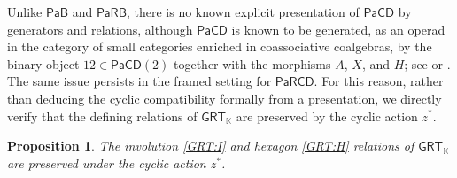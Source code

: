 \documentclass{amsart}
\newcommand{\kk}{\mathbb{K}}    %
\newcommand{\PaRB}{\mathsf{PaRB}}
\newcommand{\PaRCD}{\mathsf{PaRCD}}
\newcommand{\PaCD}{\mathsf{PaCD}}
\newcommand{\hPaRCD}{{\PaRCD}_{\kk}}
\newcommand{\PaB}{\mathsf{PaB}}
\newcommand{\cyc}{\mathbf{cyc}}
\newcommand{\Cyc}{\mathbf{Cyc}}
\newcommand{\Op}{\mathbf{Op}}
\newcommand{\GRT}{{\mathsf{GRT}}}
\newtheorem{prop}[theorem]{Proposition}%
\theoremstyle{definition}
\numberwithin{equation}{section}
\begin{document}

Unlike $\PaB$ and $\PaRB$, there is no known explicit presentation of $\PaCD$ by generators and relations, although $\PaCD$ is known to be generated, as an operad in the category of small categories enriched in coassociative coalgebras, by the binary object $12\in \PaCD(2)$ together with the morphisms $A$, $X$, and $H$; see \cite[Remark 2.24]{calaque2024associatorsoperadicpointview} or \cite[Section 10.2]{FresseBook1}. The same issue persists in the framed setting for $\PaRCD$. For this reason, rather than deducing the cyclic compatibility formally from a presentation, we directly verify that the defining relations of $\GRT_{\kk}$ are preserved by the cyclic action $z^*$.

\begin{prop}\label{prop: cyclic GRT on (H) and (I)}
The involution \eqref{GRT:I} and hexagon \eqref{GRT:H} relations of $\GRT_{\kk}$ are preserved under the cyclic action $z^*$.
\end{prop}
\end{document}
